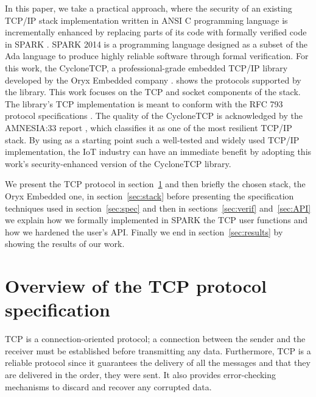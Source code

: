 \documentclass[conference]{IEEEtran}
\begin{document}
In this paper, we take a practical approach, where the security of an existing TCP/IP stack implementation written in ANSI C programming language is incrementally enhanced by replacing parts of its code with formally verified code in SPARK \cite{mccormick_chapin_2015}. SPARK 2014 is a programming language designed as a subset of the Ada language to produce highly reliable software through formal verification. For this work, the CycloneTCP, a professional-grade embedded TCP/IP library developed by the Oryx Embedded company \cite{CycloneTCP}.  shows the protocols supported by the library. This work focuses on the TCP and socket components of the stack. The library's TCP implementation is meant to conform with the RFC 793 protocol specifications \cite{rfc793}. The quality of the CycloneTCP is acknowledged by the AMNESIA:33 report \cite{AMNESIA33}, which classifies it as one of the most resilient TCP/IP stack. By using as a starting point such a well-tested and widely used TCP/IP implementation, the IoT industry can have an immediate benefit by adopting this work's security-enhanced version of the CycloneTCP library. 


We present the TCP protocol in section~\ref{sec:TCP} and then briefly the
chosen stack, the Oryx Embedded one, in section~\ref{sec:stack}
before presenting the specification techniques used in section~\ref{sec:spec}
and then in sections~\ref{sec:verif} and~\ref{sec:API} we explain how we
formally implemented in SPARK the TCP user functions and how we hardened the
user's API. Finally we end in section~\ref{sec:results} by showing the results
of our work.

\section{Overview of the TCP protocol specification}
\label{sec:TCP}



TCP is a connection-oriented protocol; a connection between the sender and the receiver must be established before transmitting any data. Furthermore, TCP is a reliable protocol since it guarantees the delivery of all the messages and that they are delivered in the order, they were sent. It also provides error-checking mechanisms to discard and recover any corrupted data.
\end{document}
